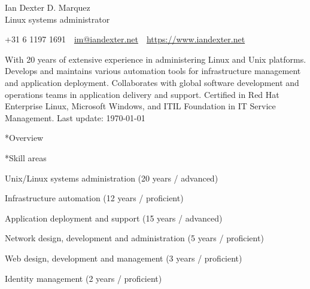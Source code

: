 \documentclass[10pt, a4paper, final]{article}
\begin{document}
\begin{center}
  \Huge Ian Dexter D. Marquez\\
  \Large Linux systems administrator
\end{center}

\begin{center}\begin{spacing}{1}\small
  +31 6 1197 1691~\textbullet~\href{mailto:im@iandexter.net}{im@iandexter.net}~\textbullet~\href{https://www.iandexter.net}{https://www.iandexter.net}\\
\end{spacing}\end{center}
\vspace{1.5em}

\normalsize With 20 years of extensive experience in administering Linux and Unix platforms. Develops and maintains various automation tools for infrastructure management and application deployment. Collaborates with global software development and operations teams in application delivery and support. Certified in Red Hat Enterprise Linux, Microsoft Windows, and ITIL Foundation in IT Service Management. \small \textcolor{dark-gray}{Last update: \textsc{\today}} \normalsize

\vspace{1em}

\begin{section}*{Overview}
  \begin{subsection}*{Skill areas}
    \begin{compactitem}
      \item Unix/Linux systems administration (20 years / advanced) 
      \item Infrastructure automation (12 years / proficient) 
      \item Application deployment and support (15 years / advanced) 
      \item Network design, development and administration (5 years / proficient) 
      \item Web design, development and management (3 years / proficient) 
      \item Identity management (2 years / proficient) 
    \end{compactitem}
  \end{subsection}
\end{section}

\vspace{1em}
\end{document}

